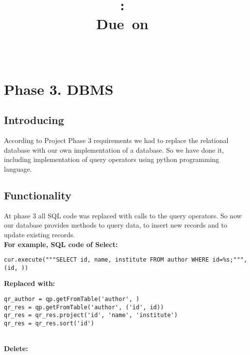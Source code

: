 \documentclass{article}
\title{
\vspace{2in}
\textmd{\textbf{\hmwkClass:\ \hmwkTitle}}\\
\normalsize\vspace{0.1in}\small{Due\ on\ \hmwkDueDate}\\
\vspace{0.1in}\large{\textit{\hmwkClassInstructor\ }}
\vspace{3in}
}
\author{\textbf{\hmwkAuthorName}}
\date{} %
\begin{document}
\maketitle



\newpage
\tableofcontents
\newpage

\section{Phase 3. DBMS}

\subsection{Introducing}
According to Project Phase 3 requirements we had to replace the relational database with our own implementation of a database. So we have done it, including implementation of query operators using python programming language.

\subsection{Functionality}
At phase 3 all SQL code was replaced with calls to the query operators. So now our database provides methods to query data, to insert new records and to update existing records. \\

\textbf{For example, SQL code of Select:}

\begin{verbatim}
cur.execute("""SELECT id, name, institute FROM author WHERE id=%s;""", (id, ))
\end{verbatim}

\textbf{Replaced with:}

\begin{verbatim}
qr_author = qp.getFromTable('author', )
qr_res = qp.getFromTable('author', ('id', id))
qr_res = qr_res.project('id', 'name', 'institute')
qr_res = qr_res.sort('id')
\end{verbatim}
~
\\
\textbf{Delete:}
\end{document}
